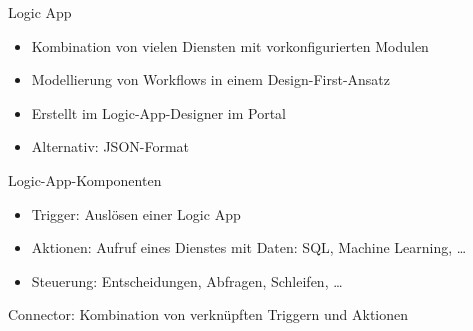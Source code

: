 
\begin{flashcard}[Definition]{Logic App}
    \begin{itemize}
        \item Kombination von vielen Diensten mit vorkonfigurierten Modulen
        \item Modellierung von Workflows in einem Design-First-Ansatz
        \item Erstellt im Logic-App-Designer im Portal
        \item Alternativ: JSON-Format
    \end{itemize}
\end{flashcard}

\begin{flashcard}[Definition]{Logic-App-Komponenten}
    \begin{itemize}
        \item Trigger:\newline
            Auslösen einer Logic App
        \item Aktionen:\newline
            Aufruf eines Dienstes mit Daten: SQL, Machine Learning, \ldots
        \item Steuerung:\newline
            Entscheidungen, Abfragen, Schleifen, \ldots
    \end{itemize}
    \vspace{1cm}
    Connector: Kombination von verknüpften Triggern und Aktionen
\end{flashcard}

